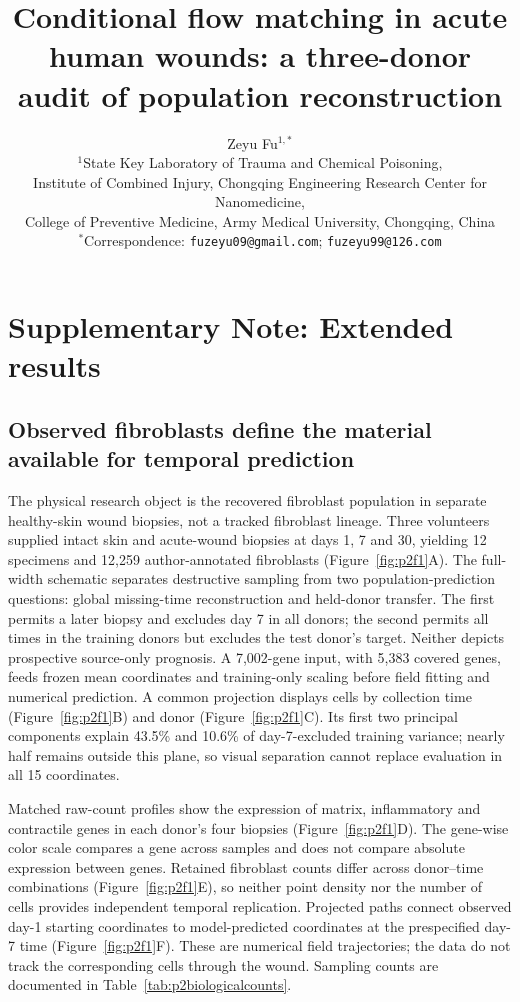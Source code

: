 \documentclass[10pt,a4paper]{article}
\title{Conditional flow matching in acute human wounds: a three-donor audit of population reconstruction}
\author{Zeyu Fu$^{1,*}$\\[3pt]\small $^1$State Key Laboratory of Trauma and Chemical Poisoning,\\\small Institute of Combined Injury, Chongqing Engineering Research Center for Nanomedicine,\\\small College of Preventive Medicine, Army Medical University, Chongqing, China\\\small $^*$Correspondence: \texttt{fuzeyu09@gmail.com}; \texttt{fuzeyu99@126.com}}\date{}
\begin{document}
\maketitle\supplement
\section*{Supplementary Note: Extended results}
\subsection{Observed fibroblasts define the material available for temporal prediction}

The physical research object is the recovered fibroblast population in separate healthy-skin wound biopsies, not a tracked fibroblast lineage. Three volunteers supplied intact skin and acute-wound biopsies at days 1, 7 and 30, yielding 12 specimens and 12,259 author-annotated fibroblasts (Figure~\ref{fig:p2f1}A\label{call:p2f1}). The full-width schematic separates destructive sampling from two population-prediction questions: global missing-time reconstruction and held-donor transfer. The first permits a later biopsy and excludes day 7 in all donors; the second permits all times in the training donors but excludes the test donor's target. Neither depicts prospective source-only prognosis. A 7,002-gene input, with 5,383 covered genes, feeds frozen mean coordinates and training-only scaling before field fitting and numerical prediction. A common projection displays cells by collection time (Figure~\ref{fig:p2f1}B) and donor (Figure~\ref{fig:p2f1}C). Its first two principal components explain 43.5\% and 10.6\% of day-7-excluded training variance; nearly half remains outside this plane, so visual separation cannot replace evaluation in all 15 coordinates.



Matched raw-count profiles show the expression of matrix, inflammatory and contractile genes in each donor's four biopsies (Figure~\ref{fig:p2f1}D). The gene-wise color scale compares a gene across samples and does not compare absolute expression between genes. Retained fibroblast counts differ across donor--time combinations (Figure~\ref{fig:p2f1}E), so neither point density nor the number of cells provides independent temporal replication. Projected paths connect observed day-1 starting coordinates to model-predicted coordinates at the prespecified day-7 time (Figure~\ref{fig:p2f1}F). These are numerical field trajectories; the data do not track the corresponding cells through the wound. Sampling counts are documented in Table~\ref{tab:p2biologicalcounts}.
\end{document}
